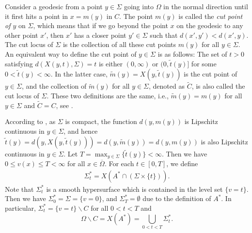 \documentclass[11pt,reqno]{amsart}
\theoremstyle{definition}
\theoremstyle{remark}
\numberwithin{equation}{section}
\renewcommand{\(}{\left(}
\renewcommand{\)}{\right)}
\renewcommand{\~}{\widetilde}
\renewcommand{\-}{\overline}
\begin{document}
Consider a geodesic from a point $y\in \Sigma$ going into $\Omega$ in the normal direction until it first hits a point in $x=m(y)$ in $C$. The point $m(y)$ is called the {\em cut point of $y$} on $\Sigma$, which means that if we go beyond the point $x$ on the geodesic to any other point $x'$, then $x'$ has a closer point $y'\in\Sigma$ such that $d(x',y')<d(x',y)$. The cut locus of $\Sigma$ is the collection of all these cut points $m(y)$ for all $y\in \Sigma$. An equivalent way to define the cut point of $y\in \Sigma$ is as follows: The set of $t>0$ satisfying $d(X(y,t),\Sigma)=t$ is either $(0,\infty)$ or $(0,\~t(y)]$ for some $0<\~t(y)<\infty$. In the latter case, $\~m(y)=X(y,\~t(y))$ is the cut point of $y\in \Sigma$, and the collection of $\~m(y)$ for all $y\in \Sigma$, denoted as $\~C$, is also called the cut locus of $\Sigma$. These two definitions are the same, i.e., $\~m(y)=m(y)$ for all $y\in \Sigma$ and $\~C=C$, see \cite[Section 4]{Li-Nirenberg2005}.

According to \cite[Theorem 1.5]{Li-Nirenberg2005}, as $\Sigma$ is compact, the function $d(y,m(y))$ is Lipschitz continuous in $y\in \Sigma$, and hence $\~t(y)=d(y,X(y,\~t(y)))=d(y,\~m(y))=d(y,m(y))$ is also Lipschitz continuous in $y\in \Sigma$. Let $T=\max_{y\in \Sigma}\{\~t(y)\}<\infty$. Then we have $0\leq v(x)\leq T<\infty$ for all $x\in \-\Omega$. For each $t\in [0,T]$, we define
\begin{align*}
\Sigma_t^\ast=X(A^\ast \cap (\Sigma \times \{t\})).
\end{align*}
Note that $\Sigma_t^\ast$ is a smooth hypersurface which is contained in the level set $\{v=t\}$. Then we have  $\Sigma_0^\ast=\Sigma=\{v=0\}$, and $\Sigma_T^{\ast}=\emptyset$ due to the definition of $A^\ast$. In particular, $\Sigma_t^\ast=\{v=t\} \backslash C$ for all $0<t<T$ and
$$
\Omega\backslash C=X(A^\ast)=\bigcup_{0< t<T}\Sigma_t^\ast.
$$
\end{document}

